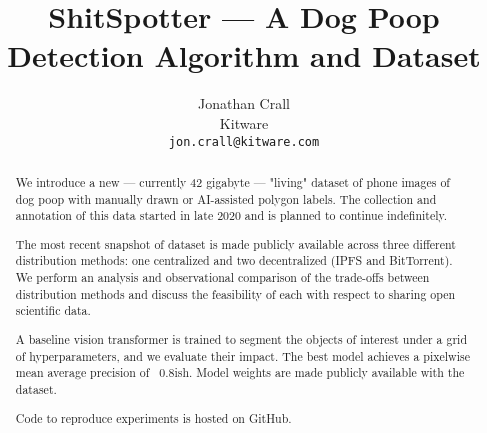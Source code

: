 \documentclass[10pt,twocolumn,letterpaper]{article}
\begin{document}
\title{ShitSpotter --- A Dog Poop Detection Algorithm and Dataset}

\author{Jonathan Crall\\
Kitware\\
{\tt\small jon.crall@kitware.com}
}
\maketitle

\begin{comment}
    cd $HOME/code/shitspotter
    python -m shitspotter.cli.coco_annotation_stats $HOME/data/dvc-repos/shitspotter_dvc/data.kwcoco.json \
        --dst_fpath $HOME/code/shitspotter/coco_annot_stats/stats.json \
        --dst_dpath $HOME/code/shitspotter/coco_annot_stats
\end{comment}

\begin{abstract}

We introduce a new --- currently 42 gigabyte --- "living" dataset of phone images of
dog poop with manually drawn or AI-assisted polygon labels.
The collection and annotation of this data started in late 2020 and is planned
to continue indefinitely.

The most recent snapshot of dataset is made publicly available across three
different distribution methods: one centralized and two decentralized (IPFS and
BitTorrent).
We perform an analysis and observational comparison of the trade-offs between
distribution methods and discuss the feasibility of each with respect to
sharing open scientific data.

A baseline vision transformer is trained to segment the objects of interest
under a grid of hyperparameters, and we evaluate their impact. The best model
achieves a pixelwise mean average precision of ~0.8ish. 
Model weights are made publicly available with the dataset. 

Code to reproduce experiments is hosted on GitHub.


\end{abstract}
\end{document}
